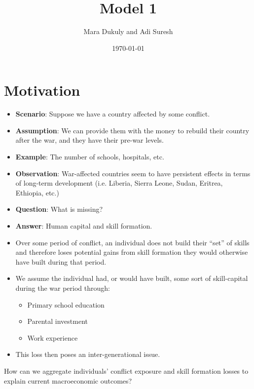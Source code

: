 \documentclass{article}
\title{Model 1}
\author{Mara Dukuly and Adi Suresh}
\date{\today}
\begin{document}
\maketitle

\section{Motivation}
\begin{itemize}
    \item \textbf{Scenario}: Suppose we have a country affected by some conflict.

    \item \textbf{Assumption}: We can provide them with the money to rebuild their country after the war, and they have their pre-war levels.

    \item \textbf{Example}: The number of schools, hospitals, etc.

    \item \textbf{Observation}: War-affected countries seem to have persistent effects in terms of long-term development (i.e. Liberia, Sierra Leone, Sudan, Eritrea, Ethiopia, etc.)

    \item \textbf{Question}: What is missing?

    \item \textbf{Answer}: Human capital and skill formation.

    \item Over some period of conflict, an individual does not build their ``set'' of skills and therefore loses potential gains from skill formation they would otherwise have built during that period.

    \item We assume the individual had, or would have built, some sort of skill-capital during the war period through:
    \begin{itemize}
        \item Primary school education
        \item Parental investment
        \item Work experience
    \end{itemize}

    \item This loss then poses an inter-generational issue.
\end{itemize}

\noindent How can we aggregate individuals' conflict exposure and skill formation losses to explain current macroeconomic outcomes?
\end{document}
